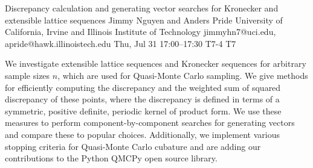 \begin{talk}
  {Discrepancy calculation and generating vector searches for Kronecker and extensible lattice sequences}%
  {Jimmy Nguyen and Anders Pride}%
  {University of California, Irvine and Illinois Institute of Technology}%
  {jimmyhn7@uci.edu, apride@hawk.illinoistech.edu}%
  {}%
  {}%
  {Thu, Jul 31 17:00--17:30}%
  {T7-4}%
  {T7}%
  {}%
  {}%
  {}%
  {}%
  {}%

We investigate extensible lattice sequences and Kronecker sequences for arbitrary sample sizes $n$, which are used for Quasi-Monte Carlo sampling. We give methods for efficiently computing the discrepancy and the weighted sum of squared discrepancy of these points, where the discrepancy is defined in terms of a symmetric, positive definite, periodic kernel of product form. We use these measures to perform component-by-component searches for generating vectors and compare these to popular choices. Additionally, we implement various stopping criteria for Quasi-Monte Carlo cubature and are adding our contributions to the Python QMCPy open source library.



\end{talk}

